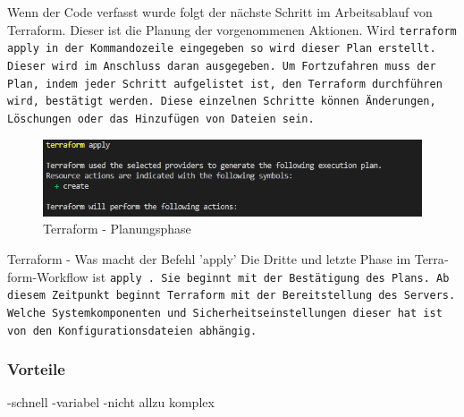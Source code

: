 \begin{otherlanguage}{ngerman}
\newline
Wenn der Code verfasst wurde folgt der nächste Schritt im Arbeitsablauf von Terraform. Dieser ist die Planung der vorgenommenen Aktionen. Wird \tt terraform apply \rm in der Kommandozeile eingegeben so wird dieser Plan erstellt. Dieser wird im Anschluss daran ausgegeben. Um Fortzufahren muss der Plan, indem jeder Schritt aufgelistet ist, den Terraform durchführen wird, bestätigt werden. Diese einzelnen Schritte können Änderungen, Löschungen oder das Hinzufügen von Dateien sein.
\begin{figure}
    \centering
    \includegraphics{LaTeX/graphic/terraformapply.png}
    \caption{Terraform - Planungsphase}
\end{figure}
 {Terraform - Was macht der Befehl 'apply'}
\newpage 
Die Dritte und letzte Phase im Terraform-Workflow ist \tt apply \rm. Sie beginnt mit der Bestätigung des Plans. Ab diesem Zeitpunkt beginnt Terraform mit der Bereitstellung des Servers. Welche Systemkomponenten und Sicherheitseinstellungen dieser hat ist von den Konfigurationsdateien abhängig. 
\newpage
\subsubsection{Vorteile}
-schnell
\newline
-variabel
\newline
-nicht allzu komplex
\end{otherlanguage}